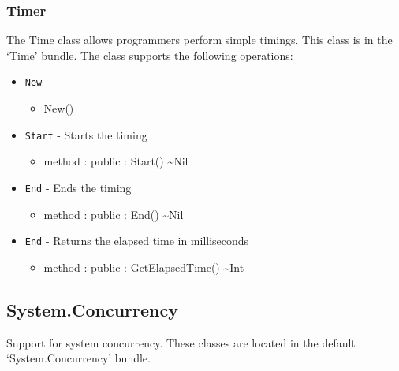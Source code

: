 \documentclass[11pt]{article}
\begin{document}
\subsubsection{Timer}
The Time class allows programmers perform simple timings.  This class
is in the `Time' bundle.  The class supports the following operations:
\begin{itemize}
\item \texttt{New}
  \begin{itemize}
  \item New()
  \end{itemize}
\item \texttt{Start} - Starts the timing
  \begin{itemize}
  \item method : public : Start() \textasciitilde Nil
  \end{itemize}
\item \texttt{End} - Ends the timing
  \begin{itemize}
  \item method : public : End() \textasciitilde Nil
  \end{itemize}
\item \texttt{End} - Returns the elapsed time in milliseconds
  \begin{itemize}
  \item method : public : GetElapsedTime() \textasciitilde Int
  \end{itemize}
\end{itemize}

\subsection{System.Concurrency}
Support for system concurrency. These classes are located in the
default `System.Concurrency' bundle.
\end{document}

